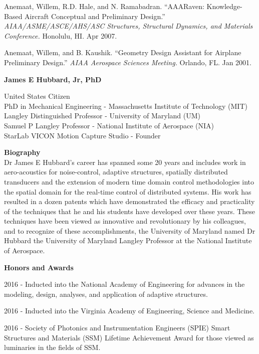 \documentclass[11pt]{article}
\newcommand{\PubSpace}{\vspace{-0.12cm}}  %
\begin{document}
\PubSpace
Anemaat, Willem, R.D. Hale, and N. Ramabadran.
``AAARaven: Knowledge-Based Aircraft Conceptual and Preliminary Design.''
\emph{AIAA/ASME/ASCE/AHS/ASC Structures, Structural Dynamics, and Materials Conference.}
Honolulu, HI.
Apr 2007.

\PubSpace
Anemaat, Willem, and B. Kaushik.
``Geometry Design Assistant for Airplane Preliminary Design.''
\emph{AIAA Aerospace Sciences Meeting.}
Orlando, FL.
Jan 2001.




\newpage
{\bf \Large James E Hubbard, Jr, PhD}

United States Citizen \\
PhD in Mechanical Engineering - Massachusetts Institute of Technology (MIT)  \\
Langley Distinguished Professor - University of Maryland (UM)  \\
Samuel P Langley Professor - National Institute of Aerospace (NIA) \\
StarLab VICON Motion Capture Studio - Founder


{\bf Biography} \\
Dr James E Hubbard's career has spanned some 20 years and includes work in aero-acoustics for noise-control, adaptive structures, spatially distributed transducers and the extension of modern time domain control methodologies into the spatial domain for the real-time control of distributed systems.  His work has resulted in a dozen patents which have demonstrated the efficacy and practicality of the techniques that he and his students have developed over these years.  These techniques have been viewed as innovative and revolutionary by his colleagues, and to recognize of these accomplishments, the University of Maryland named Dr Hubbard the University of Maryland Langley Professor at the National Institute of Aerospace.


{\bf Honors and Awards} \\
\vspace{-0.2in}

\PubSpace
2016 - Inducted into the National Academy of Engineering for advances in the modeling, design, analyses, and application of adaptive structures.

\PubSpace
2016 - Inducted into the Virginia Academy of Engineering, Science and Medicine.

\PubSpace
2016 - Society of Photonics and Instrumentation Engineers (SPIE) Smart Structures and Materials (SSM) Lifetime Achievement Award for those viewed as luminaries in the fields of SSM.
\end{document}
